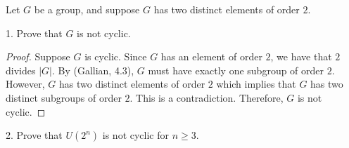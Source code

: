 \documentclass[12pt,reqno]{article}
\theoremstyle{plain}
\theoremstyle{definition}
\begin{document}
\newpage


Let \(G\) be a group, and suppose \(G\) has two distinct elements of order \(2\).

1. Prove that \(G\) is not cyclic.
\begin{proof}
    Suppose \(G\) is cyclic. Since \(G\) has an element of order \(2\), we have that \(2\) divides \(|G|\). By (Gallian, 4.3),
    \(G\) must have exactly one subgroup of order \(2\). However, \(G\) has two distinct elements of
    order \(2\) which implies that \(G\) has two distinct subgroups of order \(2\). This is a contradiction. Therefore,
    \(G\) is not cyclic.
\end{proof}

2. Prove that \(U(2^n)\) is not cyclic for \(n\geq 3\).
\end{document}

